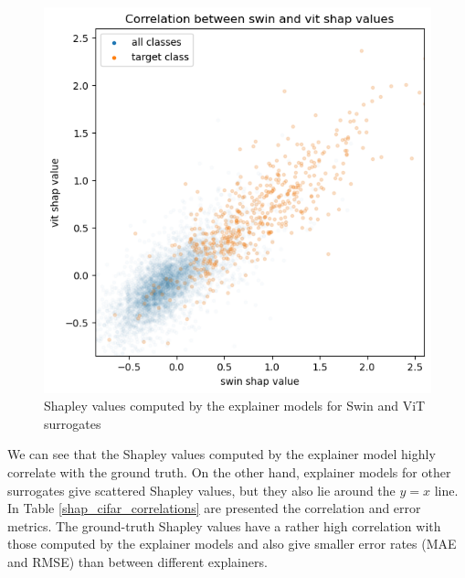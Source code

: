 \documentclass[magisterska,en]{pracamgr}
\begin{document}
\begin{figure}[H]
\centering
\includegraphics[scale=0.5]{./images/swin_vit_cifar.png}
\caption{Shapley values computed by the explainer models for Swin and ViT surrogates}
\label{swin_vit_cifar}
\end{figure}

We can see that the Shapley values computed by the explainer model highly correlate with the ground truth. On the other hand, explainer models for other surrogates give scattered Shapley values, but they also lie around the $y=x$ line. In Table \ref{shap_cifar_correlations} are presented the correlation and error metrics. The ground-truth Shapley values have a rather high correlation with those computed by the explainer models and also give smaller error rates (MAE and RMSE) than between different explainers.
\end{document}
